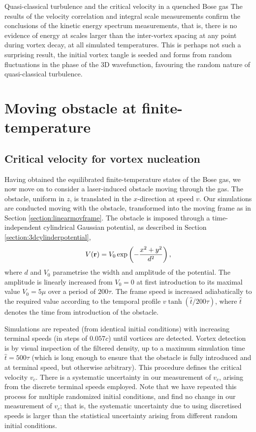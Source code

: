 \begin{chapter}{\label{cha:nonequib}Quasi-classical turbulence and the critical velocity in a quenched Bose gas}
The results of the velocity correlation and integral scale measurements confirm the conclusions of the kinetic energy spectrum measurements, that is, there is no evidence of energy at scales larger than the inter-vortex spacing at any point during vortex decay, at all simulated temperatures. This is perhaps not such a surprising result, the initial vortex tangle is seeded and forms from random fluctuations in the phase of the 3D wavefunction, favouring the random nature of quasi-classical turbulence.


\section{Moving obstacle at finite-temperature\label{sec:obstacle}}
\subsection{Critical velocity for vortex nucleation}
Having obtained the equilibrated finite-temperature states of the Bose gas, we now move on to consider a laser-induced obstacle moving through the gas.  The obstacle, uniform in $z$, is translated in the $x$-direction at speed $v$.  Our simulations are conducted moving with the obstacle, transformed into the moving frame as in Section \ref{section:linearmovframe}. The obstacle is imposed through a time-independent cylindrical Gaussian potential, as described in Section \ref{section:3dcylinderpotential},
\begin{equation*}
  V({\bf r}) = V_0 \exp\left ( -\frac{x^2+y^2}{d^2}\right ),
\end{equation*}
where $d$ and $V_0$ parametrise the width and amplitude of the potential. The amplitude is linearly increased from $V_0 = 0$ at first introduction to its maximal value $V_0=5\mu$ over a period of $200\tau$.   The frame speed is increased adiabatically to the required value according to the temporal profile $v \tanh(\hat{t}/200 \tau)$, where $\hat{t}$ denotes the time from introduction of the obstacle.

Simulations are repeated (from identical initial conditions) with increasing terminal speeds (in steps of $0.057c$) until vortices are detected.  Vortex detection is by visual inspection of the filtered density, up to a maximum simulation time $\hat{t}=500\tau$ (which is long enough to ensure that the obstacle is fully introduced and at terminal speed, but otherwise arbitrary). This procedure defines the critical velocity $v_c$.  There is a systematic uncertainty in our measurement of $v_c$, arising from the discrete terminal speeds employed.  Note that we have repeated this process for multiple randomized initial conditions, and find no change in our measurement of $v_c$; that is, the systematic uncertainty due to using discretised speeds is larger than the statistical uncertainty arising from different random initial conditions.


\end{chapter}
